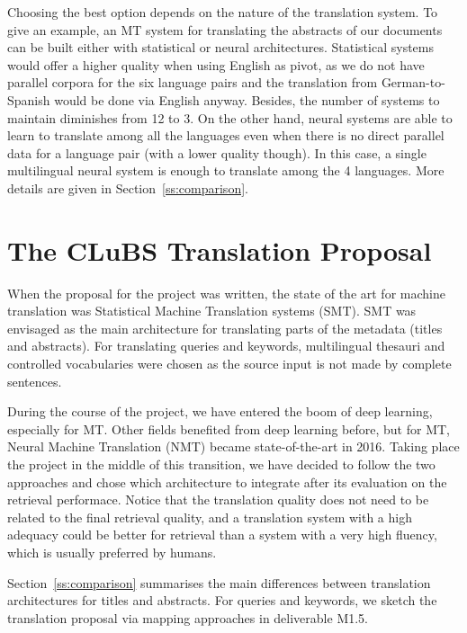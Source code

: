 \documentclass[a4paper,11pt]{article}
\begin{document}
Choosing the best option depends on the nature of the translation system. To give an example, an MT system for translating the abstracts of our documents can be built either with statistical or neural architectures. Statistical systems would offer a higher quality when using English as pivot, as we do not have parallel corpora for the six language pairs and the translation from German-to-Spanish would be done via English anyway. Besides, the number of systems to maintain diminishes from 12 to 3.
On the other hand, neural systems are able to learn to translate among all the languages even when there is no direct parallel data for a language pair (with a lower quality though). In this case, a single multilingual neural system is enough to translate among the 4 languages. More details are given in Section~\ref{ss:comparison}.



\section{The CLuBS Translation Proposal}
\label{s:proposal}

When the proposal for the project was written, the state of the art for machine translation was Statistical Machine Translation systems (SMT). SMT was envisaged as the main architecture for translating parts of the metadata (titles and abstracts). For translating queries and keywords, multilingual thesauri and controlled vocabularies were chosen as the source input is not made by complete sentences.

During the course of the project, we have entered the boom of deep learning, especially for MT. Other fields benefited from deep learning before, but for MT, Neural Machine Translation (NMT) became state-of-the-art in 2016. Taking place the project in the middle of this transition, we have decided to follow the two approaches and chose which architecture to integrate after its evaluation on the retrieval performace. Notice that the translation quality does not need to be related to the final retrieval quality, and a translation system with a high adequacy could be better for retrieval than a system with a very high fluency, which is usually preferred by humans.

Section~\ref{ss:comparison} summarises the main differences between translation architectures for titles and abstracts. For queries and keywords, we sketch the translation proposal  via mapping approaches in deliverable M1.5.
\end{document}
